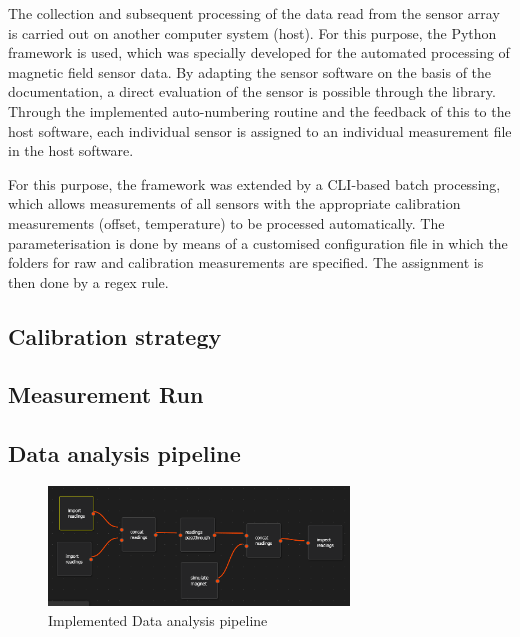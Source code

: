 \documentclass[conference]{IEEEtran}
\begin{document}
The collection and subsequent processing of the data read from the sensor array is carried out on another computer system (host).
For this purpose, the Python framework is used, which was specially developed for the automated processing of magnetic field sensor data.
By adapting the sensor software on the basis of the documentation, a direct evaluation of the sensor is possible through the library.
Through the implemented auto-numbering routine and the feedback of this to the host software, each individual sensor is assigned to an individual measurement file in the host software.

For this purpose, the framework was extended by a CLI-based batch processing, which allows measurements of all sensors with the appropriate calibration measurements (offset, temperature) to be processed automatically.
The parameterisation is done by means of a customised configuration file in which the folders for raw and calibration measurements are specified.
The assignment is then done by a regex rule.


\subsection{Calibration strategy \label{ref_calib}}



\subsection{Measurement Run}


\subsection{Data analysis pipeline}


\begin{figure}[htbp]
\centerline{\includegraphics[width=8cm]{dataprocessing_pipeline.png}}
\caption{Implemented Data analysis pipeline}
\label{dataprocessing_pipeline_fig}
\end{figure}
\end{document}
